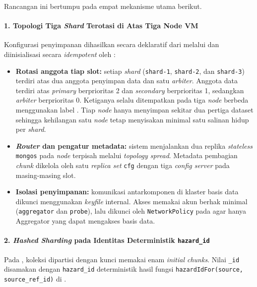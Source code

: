 Rancangan ini bertumpu pada empat mekanisme utama berikut.

\paragraph*{1. Topologi Tiga \textit{Shard} Terotasi di Atas Tiga Node VM}
Konfigurasi penyimpanan dihasilkan secara deklaratif dari  melalui  dan diinisialisasi secara \textit{idempotent} oleh :

\begin{itemize}
  \item \textbf{Rotasi anggota tiap slot:} setiap \textit{shard} (\texttt{shard-1}, \texttt{shard-2}, dan \texttt{shard-3}) terdiri atas dua anggota penyimpan data dan satu \textit{arbiter}. Anggota data terdiri atas \textit{primary} berprioritas 2 dan \textit{secondary} berprioritas 1, sedangkan \textit{arbiter} berprioritas 0. Ketiganya selalu ditempatkan pada tiga \textit{node} berbeda menggunakan label . Tiap \textit{node} hanya menyimpan sekitar dua pertiga dataset sehingga kehilangan satu \textit{node} tetap menyisakan minimal satu salinan hidup per \textit{shard}.
  \item \textbf{\textit{Router} dan pengatur metadata:} sistem menjalankan dua replika \textit{stateless} \texttt{mongos} pada \textit{node} terpisah melalui \textit{topology spread}. Metadata pembagian \textit{chunk} dikelola oleh satu \textit{replica set} \texttt{cfg} dengan tiga \textit{config server} pada masing-masing slot.
  \item \textbf{Isolasi penyimpanan:} komunikasi antarkomponen di klaster basis data dikunci menggunakan \textit{keyfile} internal. Akses memakai akun berhak minimal (\texttt{aggregator} dan \texttt{probe}), lalu dikunci oleh \texttt{NetworkPolicy} pada  agar hanya Aggregator yang dapat mengakses basis data.
\end{itemize}

\paragraph*{2. \textit{Hashed Sharding} pada Identitas Deterministik \texttt{hazard\_id}}
Pada , koleksi  dipartisi dengan kunci  memakai enam \textit{initial chunks}. Nilai \texttt{\_id} disamakan dengan \texttt{hazard\_id} deterministik hasil fungsi \texttt{hazardIdFor(source, source\_ref\_id)} di .

